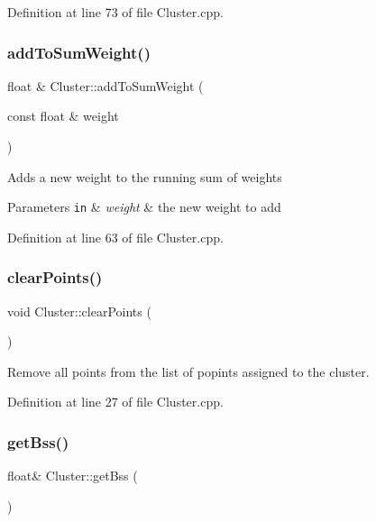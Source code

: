 Definition at line 73 of file Cluster.\+cpp.

\mbox{\label{class_cluster_a7b871b24968ca5c63bfd32cda9ff6c75}} 
\subsubsection{\texorpdfstring{add\+To\+Sum\+Weight()}{addToSumWeight()}}
{\footnotesize\ttfamily float \& Cluster\+::add\+To\+Sum\+Weight (\begin{DoxyParamCaption}\item[{const float \&}]{weight }\end{DoxyParamCaption})}

Adds a new weight to the running sum of weights


\begin{DoxyParams}[1]{Parameters}
\mbox{\tt in}  & {\em weight} & the new weight to add \\
\hline
\end{DoxyParams}


Definition at line 63 of file Cluster.\+cpp.

\mbox{\label{class_cluster_a0c4f4cc4e9249ac54ccb995b7d027f52}} 
\subsubsection{\texorpdfstring{clear\+Points()}{clearPoints()}}
{\footnotesize\ttfamily void Cluster\+::clear\+Points (\begin{DoxyParamCaption}{ }\end{DoxyParamCaption})}

Remove all points from the list of popints assigned to the cluster. 

Definition at line 27 of file Cluster.\+cpp.

\mbox{\label{class_cluster_acc50770cbc475efa285a2ff79b335530}} 
\subsubsection{\texorpdfstring{get\+Bss()}{getBss()}}
{\footnotesize\ttfamily float\& Cluster\+::get\+Bss (\begin{DoxyParamCaption}{ }\end{DoxyParamCaption})\hspace{0.3cm}{\ttfamily [inline]}}



